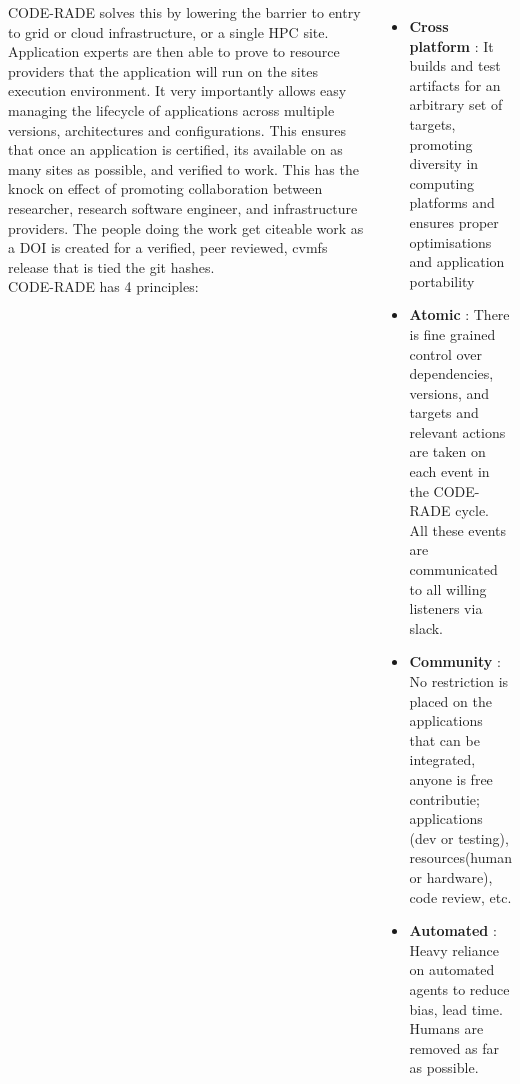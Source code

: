 \documentclass[17pt, a0paper, landscape, margin=0mm, innermargin=15mm,
     blockverticalspace=5mm, colspace=5mm, subcolspace=8mm]{tikzposter} %
\begin{document}
\begin{columns}
{             CODE-RADE solves this by lowering the barrier to entry to grid or cloud infrastructure, or a single HPC site. 
                  Application experts are then able to prove to resource providers that the application will run on the sites execution environment. 
                  It very importantly allows easy  managing the lifecycle of applications across multiple versions, architectures and configurations. 
                  This ensures that once an application is certified, its available on as many sites as possible, and verified to work.
                  This has the knock on effect of promoting collaboration between researcher, research software engineer, and infrastructure providers. 
                  The people doing the work get citeable work as a DOI is created for a verified, peer reviewed, cvmfs release that is tied the git hashes. 
         \vspace{0.5cm}\\
         CODE-RADE has 4 principles:
         \begin{itemize}
                 \item \textbf{Cross platform} : It builds and test artifacts for an arbitrary set of targets, promoting diversity in computing platforms and ensures proper optimisations and application portability 
                \item \textbf{Atomic} :
                                 There is fine grained control over dependencies, versions, and targets and relevant actions are taken on each event in the CODE-RADE cycle. \\
                                 All these events are communicated to all willing listeners via slack.
                  \item \textbf{Community} :
                      No restriction is placed on the applications that can be integrated, anyone is free contributie; applications (dev or testing), resources(human or hardware), code review, etc. 
                  \item \textbf{Automated} :
                      Heavy reliance on automated agents to reduce bias, lead time. Humans are removed as far as possible.
             \end{itemize}

         }



\end{columns}
\end{document}
